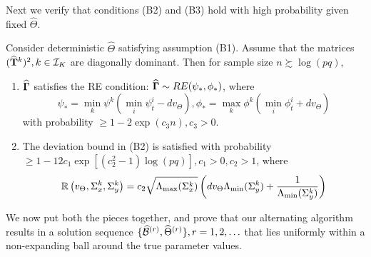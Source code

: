 Next we verify that conditions (B2) and (B3) hold with high probability given fixed $\widehat \Theta$.
\begin{Proposition}\label{prop:ThmBetaRE}
Consider deterministic $\widehat \Theta$ satisfying assumption (B1). Assume that the matrices $(\widehat {{\mathbf{T}}}^k)^2, k \in {\cal{I}}_K$ are diagonally dominant. Then for sample size $n \succsim \log (pq)$,

\begin{enumerate}
%
\item %
$\widehat {{\boldsymbol{\Gamma}}}$ satisfies the RE condition: $ \widehat {{\boldsymbol{\Gamma}}} \sim RE (\psi_*, \phi_*)$, where 
%
$$
\psi_* = \min_k \psi^k \left( \min_i \psi_t^i - d v_\Theta \right), 
\phi_* = \max_k \phi^k \left( \min_i \phi_t^i + d v_\Theta \right)
$$
%
with probability $\geq 1 - 2 \exp(c_3 n), c_3>0$.
%
\item The deviation bound in (B2) is satisfied with probability $ \geq 1 - 12 c_1 \exp[ (c_2^2-1) \log (pq)], c_1>0, c_2>1$, where
$$
{\mathbb{R}} \left(v_\Theta, \Sigma_x^k, \Sigma_y^k \right) = c_2 \sqrt{\Lambda_{\max} (\Sigma_x^k)} \left( d v_\Theta \Lambda_{\min} (\Sigma_y^k) +
\frac{1}{\Lambda_{\min} (\Sigma_y^k) } \right)
$$
\end{enumerate} 
\end{Proposition}

We now put both the pieces together, and prove that our alternating algorithm results in a solution sequence $\{ \widehat {{\cal{B}}}^{(r)}, \widehat \Theta^{(r)} \}, r = 1, 2, \ldots$ that lies uniformly within a non-expanding ball around the true parameter values.
